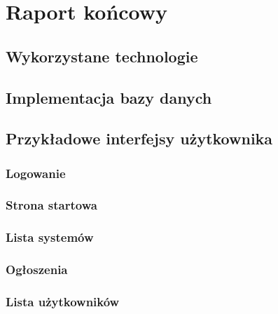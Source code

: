 \chapter{Raport końcowy}
\label{cha:raport}

\section{Wykorzystane technologie}
\label{sec:technologie}



\section{Implementacja bazy danych}
\label{sec:impldb}



\section{Przykładowe interfejsy użytkownika}
\label{sec:interfejsy}

\subsection{Logowanie}
\label{sec:login}

\subsection{Strona startowa}
\label{sec:start_page}

\subsection{Lista systemów}
\label{sec:systems}

\subsection{Ogłoszenia}
\label{sec:sessions}

\subsection{Lista użytkowników}
\label{sec:users_detail}

